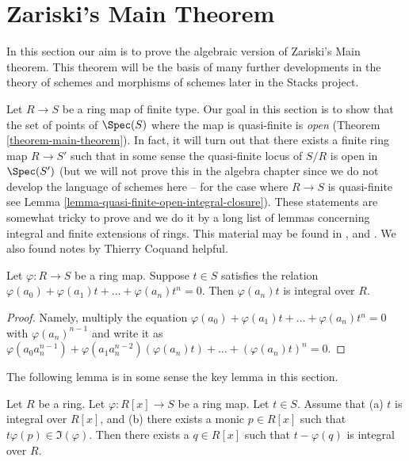 \section{Zariski's Main Theorem}
\label{section-Zariski}

\noindent
In this section our aim is to prove the algebraic version of
Zariski's Main theorem. This theorem will be the basis of many
further developments in the theory of schemes and morphisms of
schemes later in the Stacks project.

\medskip\noindent
Let $R \to S$ be a ring map of finite type.
Our goal in this section is to show that the set
of points of $\Spec(S)$ where the map is quasi-finite
is {\it open} (Theorem \ref{theorem-main-theorem}).
In fact, it will turn out that there exists
a finite ring map $R \to S'$ such that in some sense the quasi-finite
locus of $S/R$ is open in $\Spec(S')$
(but we will not prove this in the algebra chapter since we do not
develop the language of schemes here -- for the case where $R \to S$
is quasi-finite see Lemma \ref{lemma-quasi-finite-open-integral-closure}).
These statements are somewhat tricky to prove and
we do it by a long list of lemmas concerning integral and
finite extensions of rings. This material may be found
in \cite{Henselian}, and \cite{Peskine}. We also found notes
by Thierry Coquand helpful.

\begin{lemma}
\label{lemma-make-integral-trivial}
Let $\varphi : R \to S$ be a ring map.
Suppose $t \in S$ satisfies the
relation $\varphi(a_0) + \varphi(a_1)t + \ldots + \varphi(a_n) t^n = 0$.
Then $\varphi(a_n)t$ is integral over $R$.
\end{lemma}

\begin{proof}
Namely, multiply the equation
$\varphi(a_0) + \varphi(a_1)t + \ldots + \varphi(a_n) t^n = 0$
with $\varphi(a_n)^{n-1}$ and write it as
$\varphi(a_0 a_n^{n-1}) +
\varphi(a_1 a_n^{n-2}) (\varphi(a_n)t) +
\ldots +
(\varphi(a_n) t)^n = 0$.
\end{proof}

\noindent
The following lemma is in some sense the key lemma in this
section.

\begin{lemma}
\label{lemma-make-integral-trick}
Let $R$ be a ring. Let $\varphi : R[x] \to S$ be
a ring map. Let $t \in S$.
Assume that (a) $t$ is integral over $R[x]$,
and (b) there exists a monic $p \in R[x]$ such that
$t \varphi(p) \in \Im(\varphi)$. Then there
exists a $q \in R[x]$ such that $t - \varphi(q)$
is integral over $R$.
\end{lemma}

